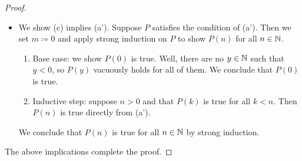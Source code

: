 \documentclass[../main.tex]{subfiles}
\begin{document}
\begin{proof}
\begin{itemize}
        \item We show (c) implies (a'). Suppose $P$ satisfies the condition of (a'). Then we set $m\coloneqq0$ and apply strong induction on $P$ to show $P(n)$ for all $n\in\mathbb N$.
        \begin{enumerate}
            \item Base case: we show $P(0)$ is true. Well, there are no $y\in\mathbb N$ such that $y<0$, so $P(y)$ vacuously holds for all of them. We conclude that $P(0)$ is true.
            \item Inductive step: suppose $n>0$ and that $P(k)$ is true for all $k<n$. Then $P(n)$ is true directly from (a').
        \end{enumerate}
        We conclude that $P(n)$ is true for all $n\in\mathbb N$ by strong induction.
    \end{itemize}
    The above implications complete the proof.
\end{proof}
\end{document}
